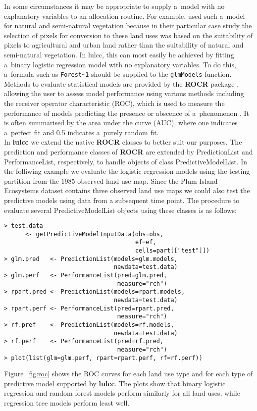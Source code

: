 \documentclass{icldt}\usepackage[]{graphicx}\usepackage[]{color}
\begin{document}
In some circumstances it may be appropriate to supply a~model with no explanatory variables to an allocation routine. For example, \citet{verburg2009} used such a~model for natural and semi-natural vegetation because in their particular case study the selection of pixels for conversion to these land uses was based on the suitability of pixels to agricultural and urban land rather than the suitability of natural and semi-natural vegetation. In lulcc, this can most easily be achieved by fitting a~binary logistic regression model with no explanatory variables. To do this, a~formula such as \texttt{Forest\textasciitilde1} should be supplied to the \texttt{glmModels} function. \\

Methods to evaluate statistical models are provided by the \textbf{ROCR} package \citep{sing2005}, allowing the user to assess model performance using various methods including the receiver operator characteristic (ROC), which is used to measure the performance of models predicting the presence or abscence of a~phenomenon \citep{pontius2014}. It is often summarised by the area under the curve (AUC), where one indicates a~perfect fit and 0.5 indicates a~purely random fit. \\

In \textbf{lulcc} we extend the native \textbf{ROCR} classes to better suit our purposes. The prediction and performance classes of \textbf{ROCR} are extended by PredictionList and PerformanceList, respectively, to handle objects of class PredictiveModelList. In the folliwing example we evaluate the logistic regression models using the testing partition from the 1985 observed land use map. Since the Plum Island Ecosystems dataset contains three observed land use maps we could also test the predictive models using data from a subsequent time point. The procedure to evaluate several PredictiveModelList objects using these classes is as follows:
\begin{verbatim}
> test.data  
      <- getPredictiveModelInputData(obs=obs, 
                                     ef=ef, 
                                     cells=part[["test"]]) 
> glm.pred   <- PredictionList(models=glm.models, 
                               newdata=test.data) 
> glm.perf   <- PerformanceList(pred=glm.pred, 
                                measure="rch") 
> rpart.pred <- PredictionList(models=rpart.models, 
                               newdata=test.data) 
> rpart.perf <- PerformanceList(pred=rpart.pred, 
                                measure="rch") 
> rf.pref    <- PredictionList(models=rf.models, 
                               newdata=test.data) 
> rf.perf    <- PerformanceList(pred=rf.pred, 
                                measure="rch") 
> plot(list(glm=glm.perf, rpart=rpart.perf, rf=rf.perf)) 
\end{verbatim}
\noindent Figure~\ref{fig:roc} shows the ROC curves for each land use type and for each type of predictive model supported by \textbf{lulcc}. The plots show that binary logistic regression and random forest models perform similarly for all land uses, while regression tree models perform least well. \\
\end{document}
